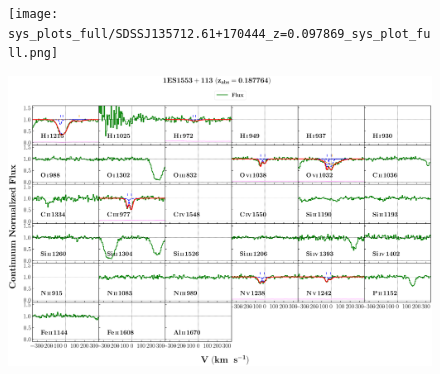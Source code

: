 \documentclass[12pt]{report}
\begin{document}
\begin{landscape}

    \begin{figure}
        \centering
        \vspace{-20mm}
        \hspace*{-35mm}
        \texttt{[image: sys\_plots\_full/SDSSJ135712.61+170444\_z=0.097869\_sys\_plot\_full.png]}
    \end{figure}
    
\end{landscape}


\begin{landscape}

    \begin{figure}
        \centering
        \vspace{-20mm}
        \hspace*{-35mm}
        \includegraphics[width=1.25\linewidth]{sys_plots_full/1ES1553+113_z=0.187764_sys_plot_full.png}
    \end{figure}
    
\end{landscape}
\end{document}
